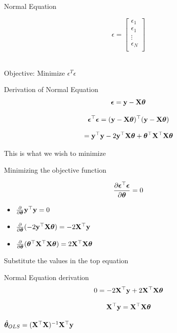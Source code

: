 \documentclass{beamer}
\begin{document}
\begin{frame}{Normal Equation}
    
\begin{equation*}
 \epsilon = 
\begin{bmatrix}
    \epsilon_{1} \\
    \epsilon_{1} \\
    \vdots \\
    \epsilon_{N} \\
\end{bmatrix}
\end{equation*}
\\
\begin{center}
 \pause Objective:   Minimize $\epsilon^{T}\epsilon$    
\end{center}
\end{frame}

\begin{frame}{Derivation of Normal Equation}
$$\boldsymbol{\epsilon} = \mathbf{y} - \mathbf{X}\boldsymbol{\theta}$$

$$\boldsymbol{\epsilon}^\top\boldsymbol{\epsilon} = (\mathbf{y} - \mathbf{X}\boldsymbol{\theta})^\top(\mathbf{y} - \mathbf{X}\boldsymbol{\theta})$$

$$= \mathbf{y}^\top\mathbf{y} - 2\mathbf{y}^\top\mathbf{X}\boldsymbol{\theta} + \boldsymbol{\theta}^\top\mathbf{X}^\top\mathbf{X}\boldsymbol{\theta}$$

This is what we wish to minimize
\end{frame}

\begin{frame}{Minimizing the objective function}
    
    
    $$\frac{\partial \boldsymbol{\epsilon}^\top \boldsymbol{\epsilon}}{\partial \boldsymbol{\theta}} = 0$$
    
    
    
    \begin{itemize}
        \item $\frac{\partial }{\partial \boldsymbol{\theta}} \mathbf{y}^\top\mathbf{y} = 0$
        \item $\frac{\partial }{\partial \boldsymbol{\theta}}(-2\mathbf{y}^\top\mathbf{X}\boldsymbol{\theta} ) = -2\mathbf{X}^\top\mathbf{y}$
        \item $\frac{\partial}{\partial\boldsymbol{\theta}} (\boldsymbol{\theta}^\top\mathbf{X}^\top\mathbf{X}\boldsymbol{\theta}) = 2\mathbf{X}^\top\mathbf{X}\boldsymbol{\theta}$
    \end{itemize}
    
    Substitute the values in the top equation
    
\end{frame}

\begin{frame}{Normal Equation derivation}
$$
    0 = -2\mathbf{X}^\top\mathbf{y} + 2\mathbf{X}^\top\mathbf{X}\boldsymbol{\theta}
$$

$$
    \mathbf{X}^\top\mathbf{y}  = \mathbf{X}^\top\mathbf{X}\boldsymbol{\theta}
$$

\begin{tcolorbox}
\begin{center}
        $\hat{\boldsymbol{\theta}}_{OLS} = (\mathbf{X}^\top\mathbf{X})^{-1}\mathbf{X}^\top\mathbf{y}$
\end{center}
\end{tcolorbox}

\end{frame}
\end{document}
